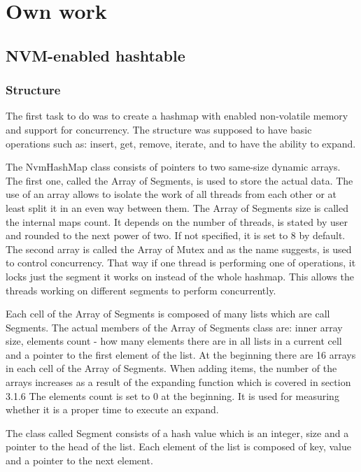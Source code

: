 
\chapter{Own work}

\section{NVM-enabled hashtable}

\subsection{Structure}

    The first task to do was to create a hashmap with enabled non-volatile memory and support for concurrency. The structure was supposed to have basic operations such as: insert, get, remove, iterate, and to have the ability to expand. 
    
    The NvmHashMap class consists of pointers to two same-size dynamic arrays. The first one, called the Array of Segments, is used to store the actual data. The use of an array allows to isolate the work of all threads from each other or at least split it in an even way between them. The Array of Segments size is called the internal maps count. It depends on the number of threads, is stated by user and rounded to the next power of two. If not specified, it is set to 8 by default. The second array is called the Array of Mutex and as the name suggests, is used to control concurrency. That way if one thread is performing one of operations, it locks just the segment it works on instead of the whole hashmap. This allows the threads working on different segments to perform concurrently.  
    
    Each cell of the Array of Segments is composed of many lists which are call Segments. The actual members of the Array of Segments class are: inner array size, elements count - how many elements there are in all lists in a current cell and a pointer to the first element of the list. 
    At the beginning there are 16 arrays in each cell of the Array of Segments. When adding items, the number of the arrays increases as a result of the expanding function which is covered in section 3.1.6
    The elements count is set to 0 at the beginning. It is used for measuring whether it is a proper time to execute an expand.
    
    The class called Segment consists of a hash value which is an integer, size and a pointer to the head of the list. Each element of the list is composed of key, value and a pointer to the next element. 
    
